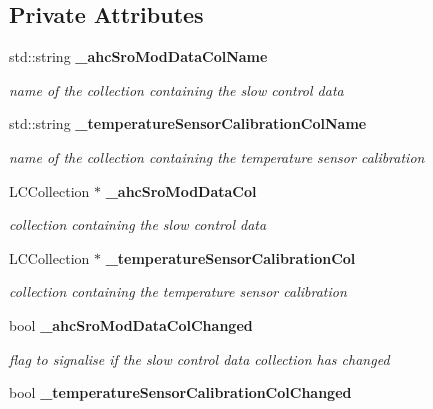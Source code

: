 \subsection*{Private Attributes}
\begin{DoxyCompactItemize}
\item 
std::string {\bf \_\-ahcSroModDataColName}\label{classCALICE_1_1SiPMTemperatureProcessor_a20b373be23412e6f4c10fb83f341c365}

\begin{DoxyCompactList}\small\item\em name of the collection containing the slow control data \item\end{DoxyCompactList}\item 
std::string {\bf \_\-temperatureSensorCalibrationColName}\label{classCALICE_1_1SiPMTemperatureProcessor_a7f729d260699eb7bac4949150379b621}

\begin{DoxyCompactList}\small\item\em name of the collection containing the temperature sensor calibration \item\end{DoxyCompactList}\item 
LCCollection $\ast$ {\bf \_\-ahcSroModDataCol}\label{classCALICE_1_1SiPMTemperatureProcessor_ab6f1a7bd77b6d74ad05d28ae00f92a96}

\begin{DoxyCompactList}\small\item\em collection containing the slow control data \item\end{DoxyCompactList}\item 
LCCollection $\ast$ {\bf \_\-temperatureSensorCalibrationCol}\label{classCALICE_1_1SiPMTemperatureProcessor_a83f01ec9192ad50fa91b8ef05bbfe0d1}

\begin{DoxyCompactList}\small\item\em collection containing the temperature sensor calibration \item\end{DoxyCompactList}\item 
bool {\bf \_\-ahcSroModDataColChanged}\label{classCALICE_1_1SiPMTemperatureProcessor_addb8e35a9df5dea954ea49672e467fe3}

\begin{DoxyCompactList}\small\item\em flag to signalise if the slow control data collection has changed \item\end{DoxyCompactList}\item 
bool {\bf \_\-temperatureSensorCalibrationColChanged}\label{classCALICE_1_1SiPMTemperatureProcessor_af6e3e77f027c314019afaa41617dc57f}


\end{DoxyCompactItemize}
